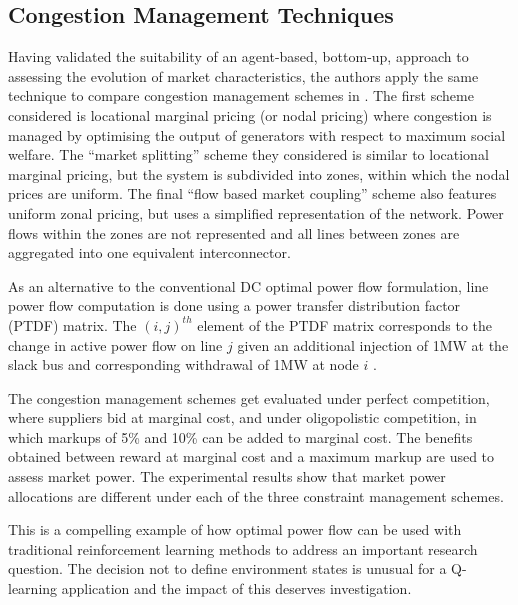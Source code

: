 \subsection{Congestion Management Techniques}
\label{sec:related_cong}
Having validated the suitability of an agent-based, bottom-up, approach to
assessing the evolution of market characteristics, the authors apply the same
technique to compare congestion management schemes in . The
first scheme considered is locational marginal pricing (or nodal pricing) where
congestion is managed by optimising the output of generators with respect to
maximum social welfare.
The ``market splitting'' scheme they considered is similar to locational
marginal pricing, but the system is subdivided into zones, within which the
nodal prices are uniform.  The final ``flow based market coupling'' scheme also
features uniform zonal pricing, but uses a simplified representation of the
network.  Power flows within the zones are not represented and all lines between
zones are aggregated into one equivalent interconnector.

As an alternative to the conventional DC optimal power flow formulation, line
power flow computation is done using a power transfer distribution factor (PTDF)
matrix.  The $(i,j)^{th}$ element of the PTDF matrix corresponds to the change
in active power flow on line $j$ given an additional injection of 1MW at the
slack bus and corresponding withdrawal of 1MW at node $i$ \cite{grainger:psa}.

The congestion management schemes get evaluated under perfect competition, where
suppliers bid at marginal cost, and under oligopolistic competition, in which
markups of 5\% and 10\% can be added to marginal cost.  The benefits obtained
between reward at marginal cost and a maximum markup are used to assess market
power.  The experimental results show that market power allocations are
different under each of the three constraint management schemes.

This is a compelling example of how optimal power flow can be used with
traditional reinforcement learning methods to address an important research
question.  The decision not to define environment states is unusual for a
Q-learning application and the impact of this deserves investigation.

